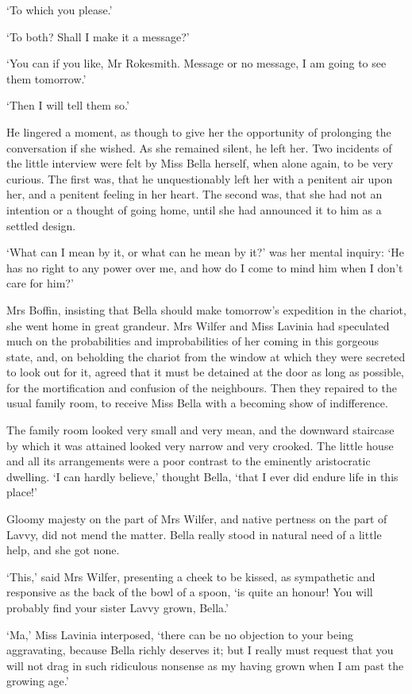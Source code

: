 ‘To which you please.’

‘To both? Shall I make it a message?’

‘You can if you like, Mr Rokesmith. Message or no message, I am going to
see them tomorrow.’

‘Then I will tell them so.’

He lingered a moment, as though to give her the opportunity of
prolonging the conversation if she wished. As she remained silent, he
left her. Two incidents of the little interview were felt by Miss Bella
herself, when alone again, to be very curious. The first was, that he
unquestionably left her with a penitent air upon her, and a penitent
feeling in her heart. The second was, that she had not an intention or
a thought of going home, until she had announced it to him as a settled
design.

‘What can I mean by it, or what can he mean by it?’ was her mental
inquiry: ‘He has no right to any power over me, and how do I come to
mind him when I don’t care for him?’

Mrs Boffin, insisting that Bella should make tomorrow’s expedition
in the chariot, she went home in great grandeur. Mrs Wilfer and Miss
Lavinia had speculated much on the probabilities and improbabilities of
her coming in this gorgeous state, and, on beholding the chariot from
the window at which they were secreted to look out for it, agreed
that it must be detained at the door as long as possible, for the
mortification and confusion of the neighbours. Then they repaired to
the usual family room, to receive Miss Bella with a becoming show of
indifference.

The family room looked very small and very mean, and the downward
staircase by which it was attained looked very narrow and very crooked.
The little house and all its arrangements were a poor contrast to the
eminently aristocratic dwelling. ‘I can hardly believe,’ thought Bella,
‘that I ever did endure life in this place!’

Gloomy majesty on the part of Mrs Wilfer, and native pertness on the
part of Lavvy, did not mend the matter. Bella really stood in natural
need of a little help, and she got none.

‘This,’ said Mrs Wilfer, presenting a cheek to be kissed, as sympathetic
and responsive as the back of the bowl of a spoon, ‘is quite an honour!
You will probably find your sister Lavvy grown, Bella.’

‘Ma,’ Miss Lavinia interposed, ‘there can be no objection to your being
aggravating, because Bella richly deserves it; but I really must request
that you will not drag in such ridiculous nonsense as my having grown
when I am past the growing age.’

